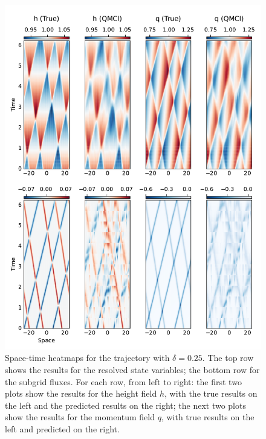 \documentclass[letterpaper,10pt,3p,preprint]{elsarticle}
\begin{document}
\begin{figure}[t!]
    \centering
    \includegraphics[width=.7\textwidth]{res01a.pdf}
    \caption{Space-time heatmaps for the trajectory with $\delta=0.25$.
    The top row shows the results for the resolved state variables;
    the bottom row for the subgrid fluxes.
    For each row, from left to right: the first two plots show the results
    for the height field $h$, with the true results on the left
    and the predicted results on the right;
    the next two plots show the results for the momentum field $q$,
    with true results on the left and predicted on the right.}
    \label{fig:res01a}
\end{figure}
\end{document}
